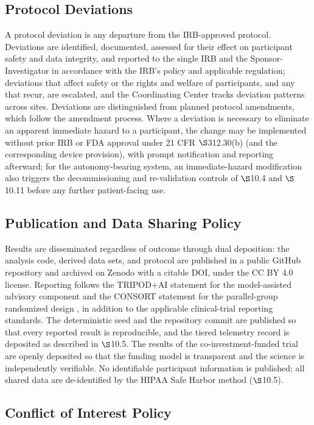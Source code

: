 \subsection{Protocol Deviations}

A protocol deviation is any departure from the IRB-approved protocol. Deviations are
identified, documented, assessed for their effect on participant safety and data
integrity, and reported to the single IRB and the Sponsor-Investigator in accordance
with the IRB's policy and applicable regulation; deviations that affect safety or
the rights and welfare of participants, and any that recur, are escalated, and the
Coordinating Center tracks deviation patterns across sites. Deviations are
distinguished from planned protocol amendments, which follow the amendment process.
Where a deviation is necessary to eliminate an apparent immediate hazard to a
participant, the change may be implemented without prior IRB or FDA approval under 21
CFR $\S$312.30(b) (and the corresponding device provision), with prompt notification
and reporting afterward; for the autonomy-bearing system, an immediate-hazard
modification also triggers the decommissioning and re-validation controls of
$\S$10.4 and $\S$10.11 before any further patient-facing use.

\subsection{Publication and Data Sharing Policy}

Results are disseminated regardless of outcome through dual deposition: the analysis
code, derived data sets, and protocol are published in a public GitHub repository
and archived on Zenodo with a citable DOI, under the CC BY 4.0 license. Reporting
follows the TRIPOD+AI statement for the model-assisted advisory component
\cite{Collins2024tripodai} and the CONSORT statement for the parallel-group
randomized design \cite{Schulz2010consort}, in addition to the applicable
clinical-trial reporting standards. The deterministic seed and the repository commit
are published so that every reported result is reproducible, and the tiered
telemetry record is deposited as described in $\S$10.5. The results of the
co-investment-funded trial are openly deposited so that the funding model is
transparent and the science is independently verifiable. No identifiable participant
information is published; all shared data are de-identified by the HIPAA Safe Harbor
method ($\S$10.5).

\subsection{Conflict of Interest Policy}

